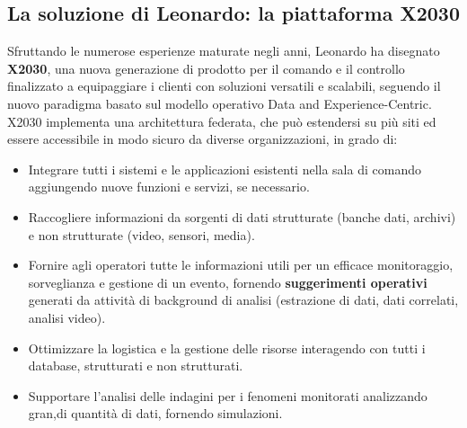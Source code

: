 \subsection{La soluzione di Leonardo: la piattaforma X2030}
Sfruttando le numerose esperienze maturate negli anni,
Leonardo ha disegnato \textbf{X2030}, una nuova generazione
di prodotto per il comando e il controllo finalizzato a equipaggiare
i clienti con soluzioni versatili e scalabili, seguendo il nuovo paradigma
basato sul modello operativo Data and Experience-Centric.
\\X2030 implementa una architettura federata, che può estendersi su più siti ed essere
accessibile in modo sicuro da diverse organizzazioni, in grado di:
\begin{itemize}

    \item Integrare tutti i sistemi e le applicazioni esistenti nella sala di comando
     aggiungendo nuove funzioni e servizi, se necessario.
    \item Raccogliere informazioni da sorgenti di dati strutturate (banche dati,
    archivi) e non strutturate (video, sensori, media).
    \item Fornire agli operatori tutte le informazioni utili
     per un efficace monitoraggio, sorveglianza e gestione di un evento,
    fornendo \textbf{suggerimenti operativi} generati da
    attività di background di analisi (estrazione di dati, dati
    correlati, analisi video).
    \item Ottimizzare la logistica e la gestione delle risorse interagendo con
    tutti i database, strutturati e non strutturati.
    \item Supportare l'analisi delle indagini per i 
    fenomeni monitorati analizzando gran,di quantità di dati,
    fornendo simulazioni.

\end{itemize}


